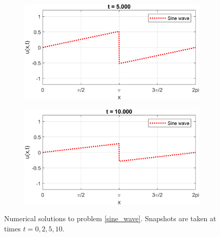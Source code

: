 \documentclass{myproject}
\begin{document}
\begin{figure}
    \begin{subfigure}[b]{0.40\textwidth}
       \includegraphics[width=1\linewidth]{sine_wave_5.png}
       \caption{}
    \end{subfigure}\qquad
    \begin{subfigure}[b]{0.40\textwidth}
       \includegraphics[width=1\linewidth]{sine_wave_10.png}
       \caption{}
    \end{subfigure}
    \caption{Numerical solutions to problem \eqref{sine_wave}. Snapshots are taken at times $t = 0, 2, 5, 10$.}
\end{figure}
\end{document}
